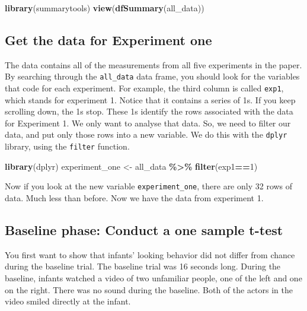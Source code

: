 \documentclass[
]{book}
\newenvironment{Shaded}{\begin{snugshade}}{\end{snugshade}}
\newcommand{\DecValTok}[1]{\textcolor[rgb]{0.00,0.00,0.81}{#1}}
\newcommand{\FunctionTok}[1]{\textcolor[rgb]{0.13,0.29,0.53}{\textbf{#1}}}
\newcommand{\NormalTok}[1]{#1}
\newcommand{\OtherTok}[1]{\textcolor[rgb]{0.56,0.35,0.01}{#1}}
\newcommand{\SpecialCharTok}[1]{\textcolor[rgb]{0.81,0.36,0.00}{\textbf{#1}}}
\begin{document}
\begin{Shaded}
\begin{Highlighting}[]
\FunctionTok{library}\NormalTok{(summarytools)}
\FunctionTok{view}\NormalTok{(}\FunctionTok{dfSummary}\NormalTok{(all\_data))}
\end{Highlighting}
\end{Shaded}

\hypertarget{get-the-data-for-experiment-one}{%
\subsection{Get the data for Experiment one}\label{get-the-data-for-experiment-one}}

The data contains all of the measurements from all five experiments in the paper. By searching through the \texttt{all\_data} data frame, you should look for the variables that code for each experiment. For example, the third column is called \texttt{exp1}, which stands for experiment 1. Notice that it contains a series of 1s. If you keep scrolling down, the 1s stop. These 1s identify the rows associated with the data for Experiment 1. We only want to analyse that data. So, we need to filter our data, and put only those rows into a new variable. We do this with the \texttt{dplyr} library, using the \texttt{filter} function.

\begin{Shaded}
\begin{Highlighting}[]
\FunctionTok{library}\NormalTok{(dplyr)}
\NormalTok{experiment\_one }\OtherTok{\textless{}{-}}\NormalTok{ all\_data }\SpecialCharTok{\%\textgreater{}\%} \FunctionTok{filter}\NormalTok{(exp1}\SpecialCharTok{==}\DecValTok{1}\NormalTok{)}
\end{Highlighting}
\end{Shaded}

Now if you look at the new variable \texttt{experiment\_one}, there are only 32 rows of data. Much less than before. Now we have the data from experiment 1.

\hypertarget{baseline-phase-conduct-a-one-sample-t-test}{%
\subsection{Baseline phase: Conduct a one sample t-test}\label{baseline-phase-conduct-a-one-sample-t-test}}

You first want to show that infants' looking behavior did not differ from chance during the baseline trial. The baseline trial was 16 seconds long. During the baseline, infants watched a video of two unfamiliar people, one of the left and one on the right. There was no sound during the baseline. Both of the actors in the video smiled directly at the infant.
\end{document}
